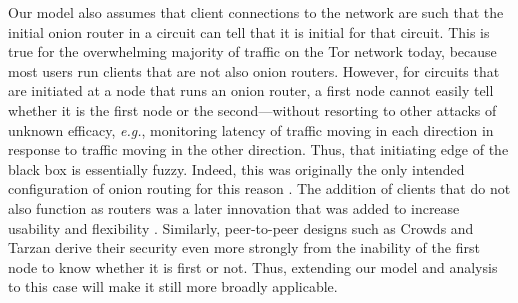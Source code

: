 \documentclass[prodmode,acmtissec]{acmsmall}
\begin{document}
Our model also assumes that client connections to the network are such
that the initial onion router in a circuit can tell that it is initial
for that circuit. This is true for the overwhelming majority of
traffic on the Tor network today, because most users run clients that
are not also onion routers. However, for circuits that are initiated
at a node that runs an onion router, a first node cannot easily tell whether it is the first node or the second---without resorting
to other attacks of unknown efficacy, \emph{e.g.}, monitoring latency of
traffic moving in each direction in response to traffic moving in the
other direction. Thus, that initiating edge of the black box is
essentially fuzzy. Indeed, this was originally the only intended
configuration of onion routing for this reason \cite{onion-routing:ih96}.  The
addition of clients that do not also function as routers was a later
innovation that was added to increase usability and flexibility
\cite{onion-routing:jsac98,onion-discex00}.  Similarly, peer-to-peer designs such as Crowds
\cite{crowds:tissec} and Tarzan \cite{tarzan:ccs02} derive their security even more
strongly from the inability of the first node to know whether it is
first or not.  Thus, extending our model and analysis to this case
will make it still more broadly applicable.

\appendix
\end{document}
